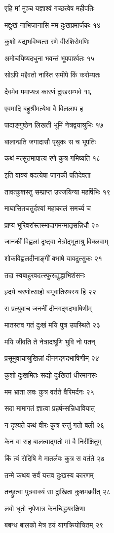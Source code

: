 एहि मां मुञ्च यज्ञाश्वं गच्छत्वेष महीपतिः

मद्दुःखं नाभिजानासि मम दुःखप्रमार्जकः १४

कुशो यद्यभविष्यत्स रणे वीरशिरोमणिः

अमोचयिष्यदधुना भवन्तं भूपपार्श्वतः १५

सोऽपि मद्दैवतो नास्ति समीपे किं करोम्यतः

दैवमेव ममाप्यत्र कारणं दुःखसम्भवे १६

एवमादि बहुश्रीमत्येषा वै विललाप ह

पादाङ्गुष्ठेन लिखती भूमिं नेत्रद्वयाश्रुभिः १७

बालान्प्रति जगादासौ पृथुकः स च भूपतिः

कथं मत्सुतमापात्य रणे कुत्र गमिष्यति १८

इति वाक्यं वदत्येषा जानकी पतिदेवता

तावत्कुशस्तु सम्प्राप्त उज्जयिन्या महर्षिभिः १९

माघासितचतुर्दश्यां महाकालं समर्च्य च

प्राप्य भूरिवरांस्तस्मादागमन्मातृसन्निधौ २०

जानकीं विह्वलां दृष्ट्वा नेत्रोद्भूताश्रु विक्लवाम्

शोकविह्वलदीनाङ्गीं बभाषे यावदुत्सुकः २१

तदा स्वबाहुरवदत्स्फुरद्युद्धाभिशंसनः

हृदये चरणोत्साहो बभूवातिरथस्य हि २२

स प्रत्युवाच जननीं दीनगद्गदभाषिणीम्

मातस्तव गतं दुःखं मयि पुत्र उपस्थिते २३

मयि जीवति ते नेत्रादश्रूणि भुवि नो पतन्

प्रसूमुवाचाश्रुखिन्नां दीनगद्गदभाषिणीम् २४

कुशो दुःखमितः सद्यो दुःखितां धीरमानसः

मम भ्राता लवः कुत्र वर्तते वैरिमर्दनः २५

सदा मामागतं ज्ञात्वा प्रहर्षन्सन्निधावियात्

न दृश्यते कथं वीरः कुत्र रन्तुं गतो बली २६

केन वा सह बालत्वाद्गतो मां वै निरीक्षितुम्

किं त्वं रोदिषि मे मातर्लवः कुत्र स वर्तते २७

तन्मे कथय सर्वं यत्तव दुःखस्य कारणम्

तच्छ्रुत्वा पुत्रवाक्यं सा दुःखिता कुशमब्रवीत् २८

लवो धृतो नृपेणात्र केनचिद्धयरक्षिणा

बबन्ध बालको मेत्र हयं यागक्रियोचितम् २९


